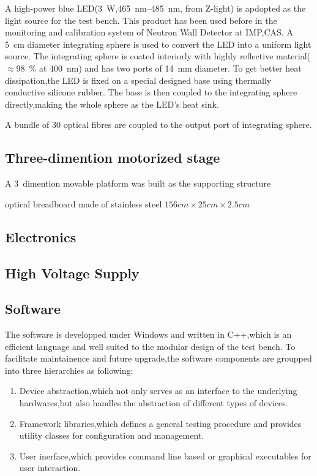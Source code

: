 \documentclass[preprint,5p,times]{elsarticle}
\begin{document}
A high-power blue LED(\SI{3}{\watt},\SIrange{465}{485}{\nano\meter}, from Z-light\cite{zlight}) is apdopted as the light source for the test bench.
This product has been used before in the monitoring and calibration system of Neutron Wall Detector at IMP,CAS\cite{yuyuhong_led}. 
A \SI{5}{\centi\meter} diameter integrating sphere is used to convert the LED into a uniform light source.
The integrating sphere is coated interiorly with highly reflective material($\approx$\SI{98}{\percent} at \SI{400}{\nano\meter}) and has two ports of \SI{14}{\milli\meter} diameter.
To get better heat dissipation,the LED is fixed on a special designed base using thermally conductive silicone rubber.
The base is then coupled to the integrating sphere directly,making the whole sphere as the LED's heat sink.

A bundle of 30 optical fibres are coupled to the output port of integrating sphere.
\subsection{Three-dimention motorized stage}
\label{sec:platform}

A 3~dimention movable platform was built as the supporting structure

optical breadboard made of stainless steel $156cm\times25cm\times2.5cm$
\subsection{Electronics}
\label{sec:integrating_sphere}

\subsection{High Voltage Supply}
\label{sec:ref_pmt}

\subsection{Software}
\label{sec:software}
The software is developped under Windows and written in C++,which is an efficient language and well suited to the modular design of the test bench.
To facilitate maintainence and future upgrade,the software components are groupped into three hierarchies as following:
\begin{enumerate}
 \item Device abstraction,which not only serves as an interface to the underlying hardwares,but also handles the abstraction of different types of devices. 
 \item Framework libraries,which defines a general testing procedure and provides utility classes for configuration and management.
 \item User inerface,which provides command line based or graphical executables for user interaction. 
\end{enumerate}
\end{document}
